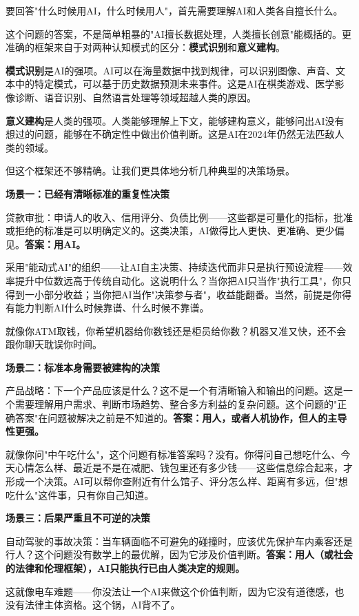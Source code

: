 要回答"什么时候用AI，什么时候用人"，首先需要理解AI和人类各自擅长什么。

这个问题的答案，不是简单粗暴的"AI擅长数据处理，人类擅长创意"能概括的。更准确的框架来自于对两种认知模式的区分：\textbf{模式识别}和\textbf{意义建构}。

\textbf{模式识别}是AI的强项。AI可以在海量数据中找到规律，可以识别图像、声音、文本中的特定模式，可以基于历史数据预测未来事件。这是AI在棋类游戏、医学影像诊断、语音识别、自然语言处理等领域超越人类的原因。

\textbf{意义建构}是人类的强项。人类能够理解上下文，能够建构意义，能够问出AI没有想过的问题，能够在不确定性中做出价值判断。这是AI在2024年仍然无法匹敌人类的领域。

但这个框架还不够精确。让我们更具体地分析几种典型的决策场景。

\textbf{场景一：已经有清晰标准的重复性决策}

贷款审批：申请人的收入、信用评分、负债比例——这些都是可量化的指标，批准或拒绝的标准是可以明确定义的。这类决策，AI做得比人更快、更准确、更少偏见。\textbf{答案：用AI。}

采用"能动式AI"的组织——让AI自主决策、持续迭代而非只是执行预设流程——效率提升中位数远高于传统自动化。这说明什么？当你把AI只当作"执行工具"，你只得到一小部分收益；当你把AI当作"决策参与者"，收益能翻番。当然，前提是你得有能力判断AI什么时候靠谱、什么时候不靠谱。

就像你ATM取钱，你希望机器给你数钱还是柜员给你数？机器又准又快，还不会跟你聊天耽误你时间。

\textbf{场景二：标准本身需要被建构的决策}

产品战略：下一个产品应该是什么？这不是一个有清晰输入和输出的问题。这是一个需要理解用户需求、判断市场趋势、整合多方利益的复杂问题。这个问题的"正确答案"在问题被解决之前是不知道的。\textbf{答案：用人，或者人机协作，但人的主导性更强。}

就像你问"中午吃什么"，这个问题有标准答案吗？没有。你得问自己想吃什么、今天心情怎么样、最近是不是在减肥、钱包里还有多少钱——这些信息综合起来，才形成一个决策。AI可以帮你查附近有什么馆子、评分怎么样、距离有多远，但"想吃什么"这件事，只有你自己知道。

\textbf{场景三：后果严重且不可逆的决策}

自动驾驶的事故决策：当车辆面临不可避免的碰撞时，应该优先保护车内乘客还是行人？这个问题没有数学上的最优解，因为它涉及价值判断。\textbf{答案：用人（或社会的法律和伦理框架），AI只能执行已由人类决定的规则。}

这就像电车难题——你没法让一个AI来做这个价值判断，因为它没有道德感，也没有法律主体资格。这个锅，AI背不了。

